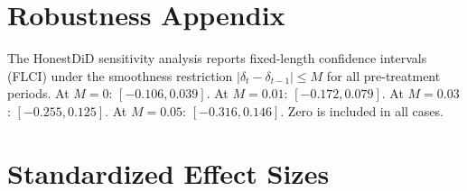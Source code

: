 \documentclass[12pt]{article}
\begin{document}
\section{Robustness Appendix}

The HonestDiD sensitivity analysis \citep{RambachanRoth2023} reports fixed-length confidence intervals (FLCI) under the smoothness restriction $|\delta_t - \delta_{t-1}| \leq M$ for all pre-treatment periods. At $M = 0$: $[-0.106, 0.039]$. At $M = 0.01$: $[-0.172, 0.079]$. At $M = 0.03$: $[-0.255, 0.125]$. At $M = 0.05$: $[-0.316, 0.146]$. Zero is included in all cases.

\section{Standardized Effect Sizes}
\label{sec:sde}


\end{document}
